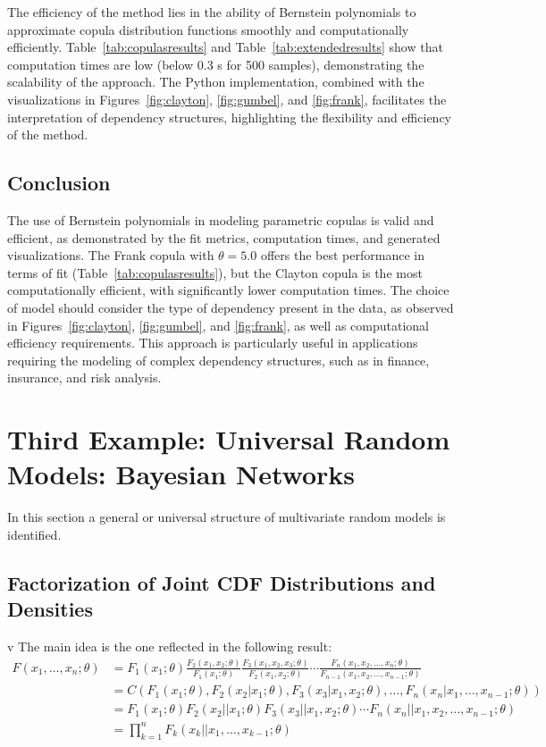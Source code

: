 \documentclass[
	11pt, %
	fleqn, %
	a4paper, %
]{LegrandOrangeBook}
\begin{document}
The efficiency of the method lies in the ability of Bernstein polynomials to approximate copula distribution functions smoothly and computationally efficiently. Table~\ref{tab:copulasresults} and Table~\ref{tab:extendedresults} show that computation times are low (below 0.3 s for 500 samples), demonstrating the scalability of the approach. The Python implementation, combined with the visualizations in Figures~\ref{fig:clayton}, \ref{fig:gumbel}, and \ref{fig:frank}, facilitates the interpretation of dependency structures, highlighting the flexibility and efficiency of the method.


\section{Conclusion}
The use of Bernstein polynomials in modeling parametric copulas is valid and efficient, as demonstrated by the fit metrics, computation times, and generated visualizations. The Frank copula with $\theta=5.0$ offers the best performance in terms of fit (Table~\ref{tab:copulasresults}), but the Clayton copula is the most computationally efficient, with significantly lower computation times. The choice of model should consider the type of dependency present in the data, as observed in Figures~\ref{fig:clayton}, \ref{fig:gumbel}, and \ref{fig:frank}, as well as computational efficiency requirements. This approach is particularly useful in applications requiring the modeling of complex dependency structures, such as in finance, insurance, and risk analysis.


\chapter{Third Example: Universal Random Models: Bayesian Networks}
\label{ch:bayesian}

In this section a general or universal structure of multivariate random models is identified.

\section{Factorization of Joint CDF Distributions and Densities}v
The main idea is the one reflected in the following result:
\begin{align}
F(x_1,\ldots, x_n;\theta) &= F_1(x_1;\theta) \frac{F_2(x_1, x_2;\theta)}{F_1(x_1;\theta)} \frac{F_3(x_1, x_2, x_3;\theta)}{F_2(x_1, x_2;\theta)} \cdots \frac{F_n(x_1, x_2,\ldots, x_n;\theta)}{F_{n-1}(x_1, x_2,\ldots, x_{n-1};\theta)} \nonumber\\
&= C(F_1(x_1;\theta), F_2(x_2 | x_1;\theta), F_3(x_3 | x_1, x_2;\theta),\ldots,F_n(x_n | x_1,\ldots, x_{n-1};\theta)) \nonumber\\
&= F_1(x_1;\theta)F_2(x_2||x_1;\theta)F_3(x_3||x_1, x_2;\theta)\cdots F_n(x_n||x_1, x_2,\ldots, x_{n-1};\theta) \nonumber\\
&= \prod_{k=1}^n F_k(x_k|| x_1,\ldots, x_{k-1};\theta)
\label{eq:factorization}
\end{align}
\end{document}
